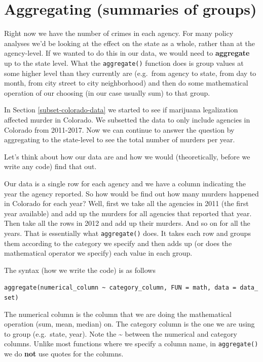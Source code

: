 \documentclass[
  12pt,
  openany]{book}
\begin{document}
\hypertarget{aggregate}{%
\section{Aggregating (summaries of groups)}\label{aggregate}}

Right now we have the number of crimes in each agency. For many policy analyses we'd be looking at the effect on the state as a whole, rather than at the agency-level. If we wanted to do this in our data, we would need to \textbf{aggregate} up to the state level. What the \texttt{aggregate()} function does is group values at some higher level than they currently are (e.g.~from agency to state, from day to month, from city street to city neighborhood) and then do some mathematical operation of our choosing (in our case usually sum) to that group.

In Section \ref{subset-colorado-data} we started to see if marijuana legalization affected murder in Colorado. We subsetted the data to only include agencies in Colorado from 2011-2017. Now we can continue to answer the question by aggregating to the state-level to see the total number of murders per year.

Let's think about how our data are and how we would (theoretically, before we write any code) find that out.

Our data is a single row for each agency and we have a column indicating the year the agency reported. So how would be find out how many murders happened in Colorado for each year? Well, first we take all the agencies in 2011 (the first year available) and add up the murders for all agencies that reported that year. Then take all the rows in 2012 and add up their murders. And so on for all the years. That is essentially what \texttt{aggregate()} does. It takes each row and groups them according to the category we specify and then adds up (or does the mathematical operator we specify) each value in each group.

The syntax (how we write the code) is as follows

\texttt{aggregate(numerical\_column\ \textasciitilde{}\ category\_column,\ FUN\ =\ math,\ data\ =\ data\_set)}

The numerical column is the column that we are doing the mathematical operation (sum, mean, median) on. The category column is the one we are using to group (e.g.~state, year). Note the \textasciitilde{} between the numerical and category columns. Unlike most functions where we specify a column name, in \texttt{aggregate()} we do \textbf{not} use quotes for the columns.
\end{document}
